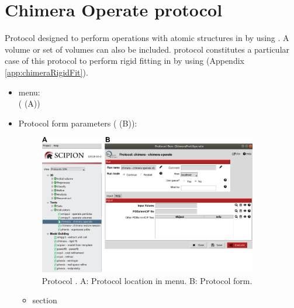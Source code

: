 \section{Chimera Operate protocol}
\label{app:chimeraOperate}%

Protocol designed to perform operations with atomic structures in \scipion by using \chimera. A volume or set of volumes can also be included. \chimera {} protocol constitutes a particular case of this protocol to perform rigid fitting in \scipion by using \chimera (Appendix \ref{app:chimeraRigidFit}).\\
   
 \begin{itemize}
  \item \scipion menu:\\
    ( (A))\\
  
  \item Protocol form parameters ( (B)):\\
  
    \begin{figure}[H]
     \centering 
     \captionsetup{width=.7\linewidth} 
     \includegraphics[width=0.90\textwidth]{Images_appendix/Fig117.pdf}
     \caption{Protocol . A: Protocol location in \scipion menu. B: Protocol form.}
     \label{fig:app_protocol_chimera_2}
    \end{figure}
    
    \begin{itemize}
     \item {} section\\


\end{itemize}
\end{itemize}
